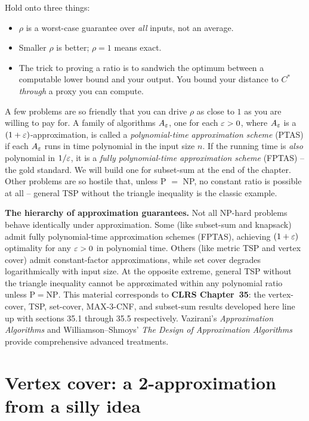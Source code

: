 \begin{focusbox}
Hold onto three things:
\begin{itemize}
\item $\rho$ is a worst-case guarantee over \emph{all} inputs, not an
average.
\item Smaller $\rho$ is better; $\rho=1$ means exact.
\item The trick to proving a ratio is to sandwich the optimum between a
computable lower bound and your output. You bound your distance to $C^{*}$
\emph{through} a proxy you can compute.
\end{itemize}
\end{focusbox}

A few problems are so friendly that you can drive $\rho$ as close to $1$ as
you are willing to pay for. A family of algorithms $A_{\varepsilon}$, one for each
$\varepsilon > 0$, where $A_{\varepsilon}$ is a $(1+\varepsilon)$-approximation, is called a
\emph{polynomial-time approximation scheme} (PTAS) if each $A_{\varepsilon}$ runs in
time polynomial in the input size $n$. If the running time is \emph{also}
polynomial in $1/\varepsilon$, it is a \emph{fully polynomial-time approximation
scheme} (FPTAS) -- the gold standard. We will build one for subset-sum at the
end of the chapter. Other problems are so hostile that, unless P $=$ NP, no
constant ratio is possible at all -- general TSP without the triangle
inequality is the classic example.

\begin{focusbox}
\textbf{The hierarchy of approximation guarantees.} Not all NP-hard problems behave
identically under approximation. Some (like subset-sum and knapsack) admit fully
polynomial-time approximation schemes (FPTAS), achieving $(1+\varepsilon)$ optimality for any $\varepsilon>0$
in polynomial time. Others (like metric TSP and vertex cover) admit constant-factor approximations,
while set cover degrades logarithmically with input size. At the opposite extreme, general TSP
without the triangle inequality cannot be approximated within any polynomial ratio unless $\mathrm{P} = \mathrm{NP}$.
This material corresponds to \textbf{CLRS Chapter~35}: the vertex-cover, TSP, set-cover,
MAX-3-CNF, and subset-sum results developed here line up with sections 35.1 through 35.5
respectively. Vazirani's \emph{Approximation Algorithms} and Williamson--Shmoys'
\emph{The Design of Approximation Algorithms} provide comprehensive advanced treatments.
\end{focusbox}

\section{Vertex cover: a 2-approximation from a silly idea}
\label{ch34:vc}

